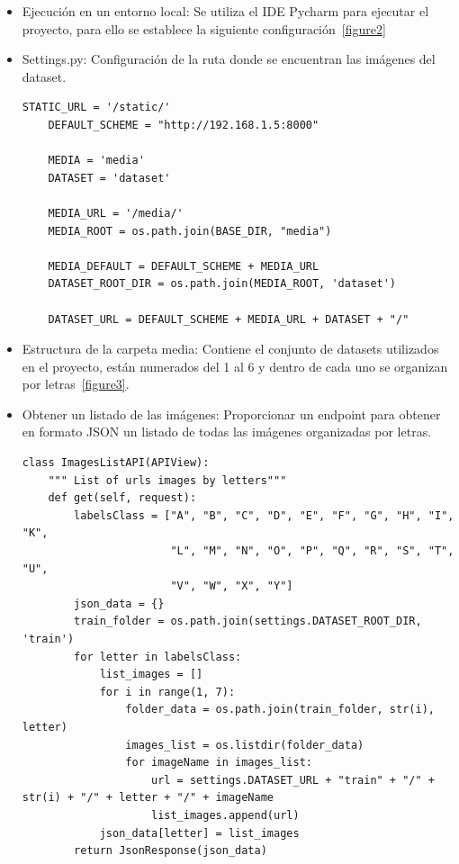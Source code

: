 \documentclass[../main.tex]{subfiles}
\begin{document}
\begin{itemize}
    \item Ejecución en un entorno local: Se utiliza el IDE Pycharm para ejecutar el proyecto, para ello se establece la siguiente configuración~\ref{figure2}
    
    \item Settings.py: Configuración de la ruta donde se encuentran las imágenes del dataset. 
    \begin{lstlisting}[style=stylepython]
    STATIC_URL = '/static/'
    DEFAULT_SCHEME = "http://192.168.1.5:8000"
    
    MEDIA = 'media'
    DATASET = 'dataset'
    
    MEDIA_URL = '/media/'
    MEDIA_ROOT = os.path.join(BASE_DIR, "media")
    
    MEDIA_DEFAULT = DEFAULT_SCHEME + MEDIA_URL
    DATASET_ROOT_DIR = os.path.join(MEDIA_ROOT, 'dataset')
    
    DATASET_URL = DEFAULT_SCHEME + MEDIA_URL + DATASET + "/"
\end{lstlisting}
    \item Estructura de la carpeta media: Contiene el conjunto de datasets utilizados en el proyecto, están numerados del 1 al 6 y dentro de cada uno se organizan por letras~\ref{figure3}.
     \item Obtener un listado de las imágenes: Proporcionar un endpoint para obtener en formato JSON un listado de todas las imágenes organizadas por letras.
     \begin{lstlisting}[style=stylepython]
     class ImagesListAPI(APIView):
    """ List of urls images by letters"""
    def get(self, request):
        labelsClass = ["A", "B", "C", "D", "E", "F", "G", "H", "I", "K",
                       "L", "M", "N", "O", "P", "Q", "R", "S", "T", "U",
                       "V", "W", "X", "Y"]
        json_data = {}
        train_folder = os.path.join(settings.DATASET_ROOT_DIR, 'train')
        for letter in labelsClass:
            list_images = []
            for i in range(1, 7):
                folder_data = os.path.join(train_folder, str(i), letter)
                images_list = os.listdir(folder_data)
                for imageName in images_list:
                    url = settings.DATASET_URL + "train" + "/" + str(i) + "/" + letter + "/" + imageName
                    list_images.append(url)
            json_data[letter] = list_images
        return JsonResponse(json_data)
     \end{lstlisting}
\end{itemize}
\end{document}
